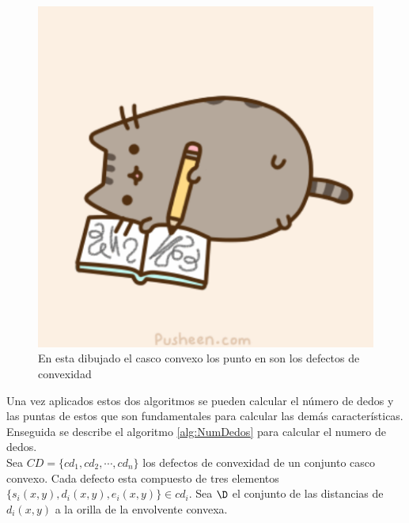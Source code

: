 \begin{figure}[!h]
\begin{center}
\includegraphics[scale=.5]{./Figures/pusheen.png}
\end{center}
\caption{En esta dibujado el casco convexo los punto en son los defectos de convexidad}
\label{fig:Convex&Defects}
\end{figure}


Una vez aplicados estos dos algoritmos se pueden calcular el número de dedos y las puntas de estos que son fundamentales para calcular las demás características. Enseguida se describe el algoritmo \ref{alg:NumDedos} para calcular el numero de dedos.\\ 
Sea $CD=\lbrace cd_1, cd_2, \cdots, cd_n \rbrace$ los defectos de convexidad de un conjunto casco convexo. Cada defecto esta compuesto de tres elementos $\lbrace s_i(x,y),d_i(x,y),e_i(x,y) \rbrace \in cd_i$. Sea $\D$ el conjunto de las distancias de $d_i(x,y)$ a la orilla de la envolvente convexa.  

